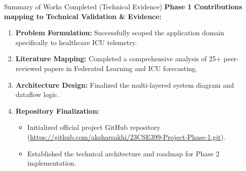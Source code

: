 \documentclass[aspectratio=169, 11pt]{beamer}
\begin{document}
\begin{frame}{Summary of Works Completed (Technical Evidence)}
    \textbf{Phase 1 Contributions mapping to Technical Validation \& Evidence:}
    \vspace{0.3cm}
    \begin{enumerate}
        \item \textbf{Problem Formulation:} Successfully scoped the application domain specifically to healthcare ICU telemetry.
        \item \textbf{Literature Mapping:} Completed a comprehensive analysis of 25+ peer-reviewed papers in Federated Learning and ICU forecasting.
        \item \textbf{Architecture Design:} Finalized the multi-layered system diagram and dataflow logic.
        \item \textbf{Repository Finalization:} 
        \begin{itemize}
            \item Initialized official project GitHub repository \\ (\url{https://github.com/aksharsakhi/23CSE399-Project-Phase-1.git}).
            \item Established the technical architecture and roadmap for Phase 2 implementation.
        \end{itemize}
    \end{enumerate}
\end{frame}
\end{document}
